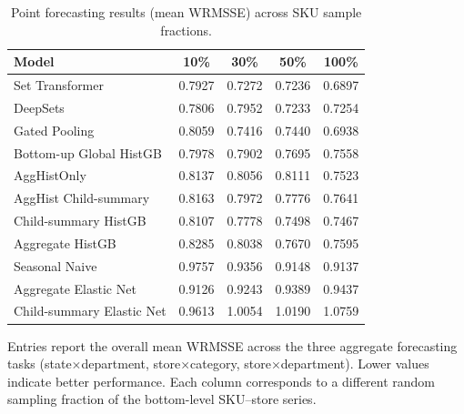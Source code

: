 \documentclass[12pt]{article}
\begin{document}
\begin{table}[H]
  \centering
  \caption{Point forecasting results (mean WRMSSE) across SKU sample fractions.}
  \label{tab:summary_point_sample_frac}
  \begin{threeparttable}
    \begin{tabular}{lcccc}
      \toprule
      Model                     & 10\%                & 30\%                & 50\%                & 100\%               \\
      \midrule
      Set Transformer                & 0.7927 & 0.7272 & 0.7236 & 0.6897 \\
      DeepSets                       & 0.7806 & 0.7952 & 0.7233 & 0.7254 \\
      Gated Pooling                  & 0.8059 & 0.7416 & 0.7440 & 0.6938 \\
      Bottom-up Global HistGB        & 0.7978 & 0.7902 & 0.7695 & 0.7558 \\
      AggHistOnly                    & 0.8137 & 0.8056 & 0.8111 & 0.7523 \\
      AggHist Child-summary          & 0.8163 & 0.7972 & 0.7776 & 0.7641 \\
      Child-summary HistGB           & 0.8107 & 0.7778 & 0.7498 & 0.7467 \\
      Aggregate HistGB               & 0.8285 & 0.8038 & 0.7670 & 0.7595 \\
      Seasonal Naive                 & 0.9757 & 0.9356 & 0.9148 & 0.9137 \\
      Aggregate Elastic Net          & 0.9126 & 0.9243 & 0.9389 & 0.9437 \\
      Child-summary Elastic Net      & 0.9613 & 1.0054 & 1.0190 & 1.0759 \\
      \bottomrule
    \end{tabular}
    \begin{tablenotes}
      \footnotesize \item Entries report the overall mean WRMSSE across the three aggregate forecasting tasks (state$\times$department, store$\times$category, store$\times$department). Lower values indicate better performance. Each column corresponds to a different random sampling fraction of the bottom-level SKU--store series.
    \end{tablenotes}
  \end{threeparttable}
\end{table}
\end{document}
